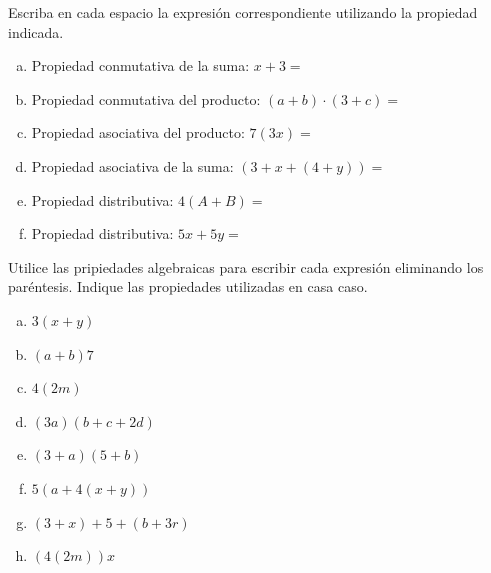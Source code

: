 \documentclass[11pt]{article}
\begin{document}
\begin{exercise}
Escriba en cada espacio la expresión correspondiente utilizando la propiedad indicada.
\begin{enumerate}[a)]
\item Propiedad conmutativa de la suma: $x+3=$ \blank[width=3cm]{}
\item Propiedad conmutativa del producto: $(a+b) \cdot(3+c) =$ \blank[width=3cm]{}
\item Propiedad asociativa del producto: $7(3x) =$ \blank[width=3cm]{}
\item Propiedad asociativa de la suma: $(3+x+(4+y)) =$ \blank[width=3cm]{}
\item Propiedad distributiva: $4(A+B) =$ \blank[width=3cm]{}
\item Propiedad distributiva: $5x + 5y =$ \blank[width=3cm]{}
\end{enumerate}
\end{exercise}

\begin{exercise}
Utilice las pripiedades algebraicas para escribir cada expresión eliminando los paréntesis. Indique las propiedades utilizadas en casa caso.
\begin{multicols}{3}
    \begin{enumerate}[a)]
        \item $3(x+y)$
        \item $(a+b)7$
        \item $4(2m)$
        \item $(3a)(b+c+2d)$
        \item $(3+a)(5+b)$
        \item $5(a+4(x+y))$
        \item $(3+x)+5+(b+3r)$
        \item $(4(2m))x$
    \end{enumerate}
\end{multicols}
\end{exercise}
\end{document}
